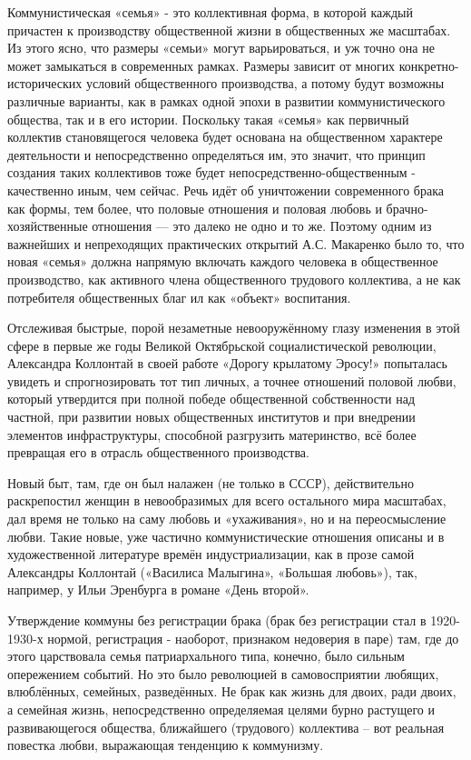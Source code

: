 \documentclass[../main]{subfiles}
\begin{document}
Коммунистическая «семья» - это коллективная форма, в которой каждый причастен к производству общественной жизни в общественных же масштабах. Из этого ясно, что размеры «семьи» могут варьироваться, и уж точно она не может замыкаться в современных рамках. Размеры зависит от многих конкретно-исторических условий общественного производства, а потому будут возможны различные варианты, как в рамках одной эпохи в развитии коммунистического общества, так и в его истории. Поскольку такая «семья» как первичный коллектив становящегося человека будет основана на общественном характере деятельности и непосредственно определяться им, это значит, что принцип создания таких коллективов тоже будет непосредственно-общественным - качественно иным, чем сейчас. Речь идёт об уничтожении современного брака как формы, тем более, что половые отношения и половая любовь и брачно-хозяйственные отношения — это далеко не одно и то же. Поэтому одним из важнейших и непреходящих практических открытий А.С. Макаренко было то, что новая «семья» должна напрямую включать каждого человека в общественное производство, как активного члена общественного трудового коллектива, а не как потребителя общественных благ ил как «объект» воспитания.

Отслеживая быстрые, порой незаметные невооружённому глазу изменения в этой сфере в первые же годы Великой Октябрьской социалистической революции, Александра Коллонтай в своей работе «Дорогу крылатому Эросу!» попыталась увидеть и спрогнозировать тот тип личных, а точнее отношений половой любви, который утвердится при полной победе общественной собственности над частной, при развитии новых общественных институтов и при внедрении элементов инфраструктуры, способной разгрузить материнство, всё более превращая его в отрасль общественного производства.

Новый быт, там, где он был налажен (не только в СССР), действительно раскрепостил женщин в невообразимых для всего остального мира масштабах, дал время не только на саму любовь и «ухаживания», но и на переосмысление любви. Такие новые, уже частично коммунистические отношения описаны и в художественной литературе времён индустриализации, как в прозе самой Александры Коллонтай («Василиса Малыгина», «Большая любовь»), так, например, у Ильи Эренбурга в романе «День второй».

Утверждение коммуны без регистрации брака (брак без регистрации стал в 1920-1930-х нормой, регистрация - наоборот, признаком недоверия в паре) там, где до этого царствовала семья патриархального типа, конечно, было сильным опережением событий. Но это было революцией в самовосприятии любящих, влюблённых, семейных, разведённых. Не брак как жизнь для двоих, ради двоих, а семейная жизнь, непосредственно определяемая целями бурно растущего и развивающегося общества, ближайшего (трудового) коллектива – вот реальная повестка любви, выражающая тенденцию к коммунизму.
\end{document}
